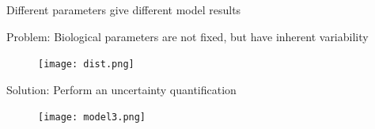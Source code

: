\documentclass[presentation]{beamer}
\begin{document}
\begin{frame}{Different parameters give different model results}
    \begin{figure}
      \end{figure}

\end{frame}






\begin{frame}{Problem: Biological parameters are not fixed, but have inherent variability}
    \begin{figure}
\texttt{[image: dist.png]}
\end{figure}
\end{frame}

\begin{frame}{Solution: Perform an uncertainty quantification}
    \begin{figure}
        \texttt{[image: model3.png]}
    \end{figure}
\end{frame}


\end{document}
